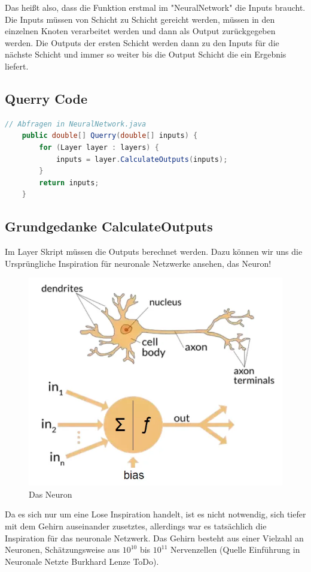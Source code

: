 \documentclass[12pt]{article}
\begin{document}
Das heißt also, dass die Funktion erstmal im "NeuralNetwork" die Inputs braucht. Die Inputs müssen von Schicht zu Schicht gereicht werden, müssen in den einzelnen Knoten verarbeitet werden und dann als Output zurückgegeben werden. Die Outputs der ersten Schicht werden dann zu den Inputs für die nächste Schicht und immer so weiter bis die Output Schicht die ein Ergebnis liefert.\subsection{Querry Code}\begin{lstlisting}[language=Java]
// Abfragen in NeuralNetwork.java
    public double[] Querry(double[] inputs) {
        for (Layer layer : layers) {
            inputs = layer.CalculateOutputs(inputs);
        }
        return inputs;
    }
\end{lstlisting}\subsection{Grundgedanke CalculateOutputs}Im Layer Skript müssen die Outputs berechnet werden. Dazu können wir uns die Ursprüngliche Inspiration für neuronale Netzwerke ansehen, das Neuron!
\begin{figure}[H]
\centering
\includegraphics[scale=0.40]{./Images/Pasted image 20230912175903.png}
\caption{Das Neuron}
\label{Was kommt hier rein?}
\end{figure}
Da es sich nur um eine Lose Inspiration handelt, ist es nicht notwendig, sich tiefer mit dem Gehirn auseinander zusetztes, allerdings war es tatsächlich die Inspiration für das neuronale Netzwerk. Das Gehirn besteht aus einer Vielzahl an Neuronen, Schätzungsweise aus $10^{10}$ bis $10^{11}$ Nervenzellen (Quelle Einführung in Neuronale Netzte Burkhard Lenze ToDo).
\end{document}
